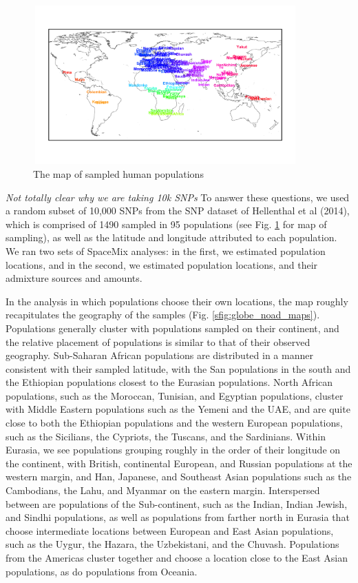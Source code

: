 \documentclass[12pt]{article}
\newcommand{\gc}[1]{{\em \color{blue} #1}}
\begin{document}
\begin{figure}
	\centering
	\includegraphics[width=4in,height=2.4in]{figs/globetrotter/globe_world_map_text.png}
	\caption{The map of sampled human populations}\label{globe_world_map}
\end{figure}

\gc{Not totally clear why we are taking 10k SNPs}
To answer these questions, we used a random subset of 10,000 SNPs from the SNP dataset of Hellenthal et al (2014), which is comprised of 1490 sampled in 95 populations (see Fig. \ref{globe_world_map} for map of sampling), as well as the latitude and longitude attributed to each population.  We ran two sets of SpaceMix analyses: in the first, we estimated population locations, and in the second, we estimated population locations, and their admixture sources and amounts.

In the analysis in which populations choose their own locations, the map roughly recapitulates the geography of the samples (Fig. \ref{sfig:globe_noad_maps}).  Populations generally cluster with populations sampled on their continent, and the relative placement of populations is similar to that of their observed geography.  Sub-Saharan African populations are distributed in a manner consistent with their sampled latitude, with the San populations in the south and the Ethiopian populations closest to the Eurasian populations.  North African populations, such as the Moroccan, Tunisian, and Egyptian populations, cluster with Middle Eastern populations such as the Yemeni and the UAE, and are quite close to both the Ethiopian populations and the western European populations, such as the Sicilians, the Cypriots, the Tuscans, and the Sardinians.  Within Eurasia, we see populations grouping roughly in the order of their longitude on the continent, with British, continental European, and Russian populations at the western margin, and Han, Japanese, and Southeast Asian populations such as the Cambodians, the Lahu, and Myanmar on the eastern margin.  Interspersed between are populations of the Sub-continent, such as the Indian, Indian Jewish, and Sindhi populations, as well as populations from farther north in Eurasia that choose intermediate locations between European and East Asian populations, such as the Uygur, the Hazara, the Uzbekistani, and the Chuvash.  Populations from the Americas cluster together and choose a location close to the East Asian populations, as do populations from Oceania.
\end{document}
